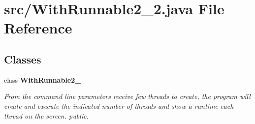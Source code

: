 \section{src/\+With\+Runnable2\+\_\+2.java File Reference}
\label{_with_runnable2__2_8java}
\subsection*{Classes}
\begin{DoxyCompactItemize}
\item 
class {\bf With\+Runnable2\+\_}
\begin{DoxyCompactList}\small\item\em From the command line parameters receive few threads to create, the program will create and execute the indicated number of threads and show a runtime each thread on the screen.  public. \end{DoxyCompactList}\end{DoxyCompactItemize}
